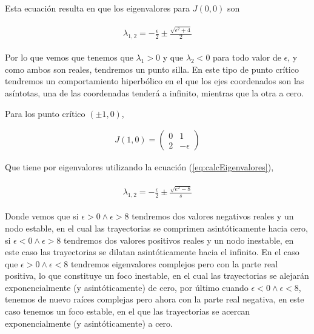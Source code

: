 \documentclass[a4paper,10pt]{article}
\numberwithin{equation}{section}
\begin{document}
Esta ecuación resulta en que los eigenvalores para $J(0,0)$ son

\begin{align}
 \begin{split}
  \lambda_{1,2} = - \frac{\epsilon}{2} \pm \frac{\sqrt{\epsilon^2 + 4}}{2}
 \end{split}
\end{align}

Por lo que vemos que tenemos que $\lambda_1 > 0$ y que $\lambda_2 < 0$ para todo valor
de $\epsilon$, y como ambos son reales, tendremos un punto silla. En este tipo de punto
crítico tendremos un comportamiento hiperbólico en el que los ejes coordenados son 
las asíntotas, una de las coordenadas tenderá a infinito, mientras que la otra a cero.

Para los punto crítico $(\pm 1,0)$,

\begin{align}
J(1,0) = \begin{pmatrix}
     0 & 1 \\
     2 & -\epsilon
\end{pmatrix}
\label{eq:jacobiana3s}
\end{align}

Que tiene por eigenvalores utilizando la ecuación (\ref{eq:calcEigenvalores}),

\begin{align}
 \begin{split}
  \lambda_{1,2} = - \frac{\epsilon}{2} \pm \frac{\sqrt{e^2-8}}{s}
 \end{split}
\end{align}

Donde vemos que si $\epsilon > 0 \wedge \epsilon > 8$ tendremos dos valores negativos
reales y un nodo estable, en el cual las trayectorias se comprimen asintóticamente hacia
cero, si $\epsilon < 0 \wedge \epsilon > 8$ tendremos dos valores positivos reales y un
nodo inestable, en este caso las trayectorias se dilatan asintóticamente hacia el infinito.
En el caso que $\epsilon > 0 \wedge \epsilon < 8$ tendremos eigenvalores complejos
pero con la parte real positiva, lo que constituye un foco inestable, en el cual las trayectorias
se alejarán exponencialmente (y asintóticamente) de cero, por último cuando $\epsilon < 0 \wedge \epsilon < 8$, tenemos
de nuevo raíces complejas pero ahora con la parte real negativa, en este caso tenemos un
foco estable, en el que las trayectorias se acercan exponencialmente (y asintóticamente) a cero.
\end{document}
